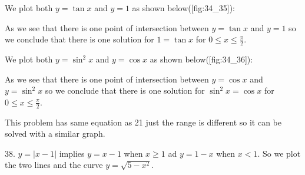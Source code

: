 \item We plot both $y = \tan x$ and $y = 1$ as shown below([fig:34_35]):

  \startplacefigure[title={Plot of $\tan x$ and $y = 1$}, reference=fig:34_35]
    \externalfigure[34_35.pdf]
  \stopplacefigure
  As we see that there is one point of intersection between $y = \tan x$ and $y = 1$ so we
  conclude that there is one solution for $1 = \tan x$ for $0\leq x\leq\frac{\pi}{2}$.

\item We plot both $y = \sin^2x$ and $y = \cos x$ as shown below([fig:34_36]):

  \startplacefigure[title={Plot of $\sin^2 x$ and $\cos x$}, reference=fig:34_36]
    \externalfigure[34_36.pdf]
  \stopplacefigure

  As we see that there is one point of intersection between $y = \cos x$ and $y = \sin^2x$ so we
  conclude that there is one solution for $\sin^2x = \cos x$ for $0\leq x\leq\frac{\pi}{2}$.

\item This problem has same equation as 21 just the range is different so it can be solved with a
  similar graph.

38. $y = |x - 1|$ implies $y = x - 1$ when $x \geq 1$ ad $y = 1 - x$ when $x <
    1$. So we plot the two lines and the curve $y = \sqrt{5 - x^2}$.

  \startplacefigure[reference=fig:34_38]
    \externalfigure[34_38.pdf]
  \stopplacefigure
\stopitemize
